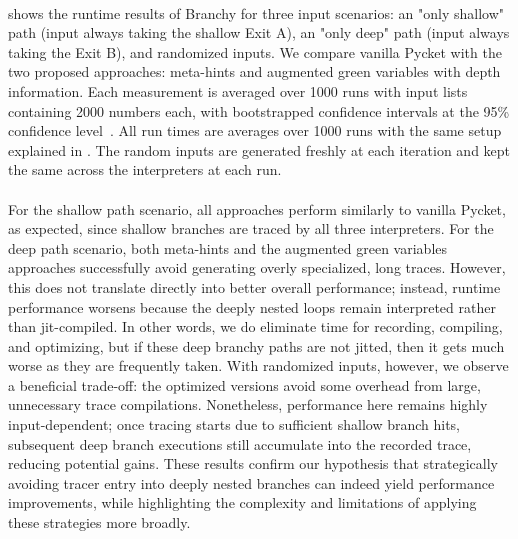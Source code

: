 
    \paragraph{}%
       shows the runtime results of Branchy for three input scenarios: an "only shallow" path (input always taking the shallow Exit A), an "only deep" path (input always taking the Exit B), and randomized inputs. We compare vanilla Pycket with the two proposed approaches: meta-hints and augmented green variables with depth information. Each measurement is averaged over 1000 runs with input lists containing 2000 numbers each, with bootstrapped confidence intervals at the 95\% confidence level~\cite{davisonBootstrapMethods2013}. All run times are averages over 1000 runs with the same setup explained in . The random inputs are generated freshly at each iteration and kept the same across the interpreters at each run.

    \paragraph{}%
      For the shallow path scenario, all approaches perform similarly to vanilla Pycket, as expected, since shallow branches are traced by all three interpreters. For the deep path scenario, both meta-hints and the augmented green variables approaches successfully avoid generating overly specialized, long traces. However, this does not translate directly into better overall performance; instead, runtime performance worsens because the deeply nested loops remain interpreted rather than \gls{jit}-compiled. In other words, we do eliminate time for recording, compiling, and optimizing, but if these deep branchy paths are not \gls{jit}ted, then it gets much worse as they are frequently taken. With randomized inputs, however, we observe a beneficial trade-off: the optimized versions avoid some overhead from large, unnecessary trace compilations. Nonetheless, performance here remains highly input-dependent; once tracing starts due to sufficient shallow branch hits, subsequent deep branch executions still accumulate into the recorded trace, reducing potential gains. These results confirm our hypothesis that strategically avoiding tracer entry into deeply nested branches can indeed yield performance improvements, while highlighting the complexity and limitations of applying these strategies more broadly.

